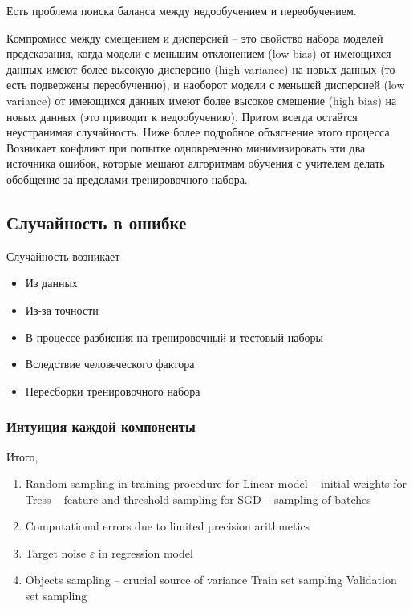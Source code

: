 Есть проблема поиска баланса между недообучением и переобучением.

Компромисс между смещением и дисперсией -- это свойство набора моделей предсказания, когда модели с меньшим
отклонением (low bias) от имеющихся данных имеют более высокую дисперсию (high variance) на новых данных (то есть
подвержены переобучению), и наоборот модели с меньшей дисперсией (low variance) от имеющихся данных имеют более
высокое смещение (high bias) на новых данных (это приводит к недообучению).
Притом всегда остаётся неустранимая случайность.
Ниже более подробное объяснение этого процесса.
Возникает конфликт при попытке одновременно минимизировать эти два источника ошибок, которые мешают алгоритмам
обучения с учителем делать обобщение за пределами тренировочного набора.

\subsection{Случайность в ошибке}
Случайность возникает
\begin{itemize}
    \item Из данных
    \item Из-за точности
    \item В процессе разбиения на тренировочный и тестовый наборы
    \item Вследствие человеческого фактора
    \item Пересборки тренировочного набора
\end{itemize}

\subsubsection{Интуиция каждой компоненты}

Итого,
\begin{enumerate}
    \item Random sampling in training procedure
    \subitem for Linear model -- initial weights
    \subitem for Tress -- feature and threshold sampling
    \subitem for SGD -- sampling of batches
    \item Computational errors due to limited precision arithmetics
    \item Target noise
    \subitem $\varepsilon$ in regression model
    \item Objects sampling -- crucial source of variance
    \subitem Train set sampling
    \subitem Validation set sampling
\end{enumerate}

